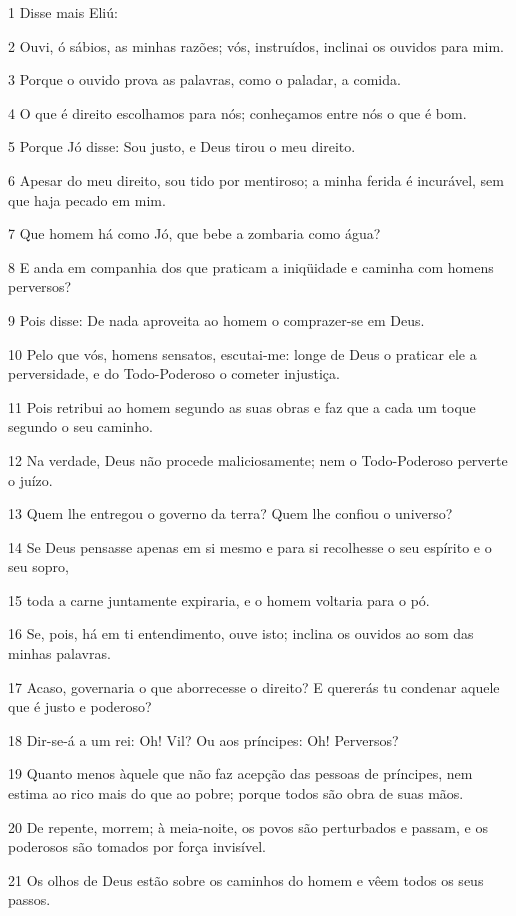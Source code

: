 \par 1 Disse mais Eliú:
\par 2 Ouvi, ó sábios, as minhas razões; vós, instruídos, inclinai os ouvidos para mim.
\par 3 Porque o ouvido prova as palavras, como o paladar, a comida.
\par 4 O que é direito escolhamos para nós; conheçamos entre nós o que é bom.
\par 5 Porque Jó disse: Sou justo, e Deus tirou o meu direito.
\par 6 Apesar do meu direito, sou tido por mentiroso; a minha ferida é incurável, sem que haja pecado em mim.
\par 7 Que homem há como Jó, que bebe a zombaria como água?
\par 8 E anda em companhia dos que praticam a iniqüidade e caminha com homens perversos?
\par 9 Pois disse: De nada aproveita ao homem o comprazer-se em Deus.
\par 10 Pelo que vós, homens sensatos, escutai-me: longe de Deus o praticar ele a perversidade, e do Todo-Poderoso o cometer injustiça.
\par 11 Pois retribui ao homem segundo as suas obras e faz que a cada um toque segundo o seu caminho.
\par 12 Na verdade, Deus não procede maliciosamente; nem o Todo-Poderoso perverte o juízo.
\par 13 Quem lhe entregou o governo da terra? Quem lhe confiou o universo?
\par 14 Se Deus pensasse apenas em si mesmo e para si recolhesse o seu espírito e o seu sopro,
\par 15 toda a carne juntamente expiraria, e o homem voltaria para o pó.
\par 16 Se, pois, há em ti entendimento, ouve isto; inclina os ouvidos ao som das minhas palavras.
\par 17 Acaso, governaria o que aborrecesse o direito? E quererás tu condenar aquele que é justo e poderoso?
\par 18 Dir-se-á a um rei: Oh! Vil? Ou aos príncipes: Oh! Perversos?
\par 19 Quanto menos àquele que não faz acepção das pessoas de príncipes, nem estima ao rico mais do que ao pobre; porque todos são obra de suas mãos.
\par 20 De repente, morrem; à meia-noite, os povos são perturbados e passam, e os poderosos são tomados por força invisível.
\par 21 Os olhos de Deus estão sobre os caminhos do homem e vêem todos os seus passos.
